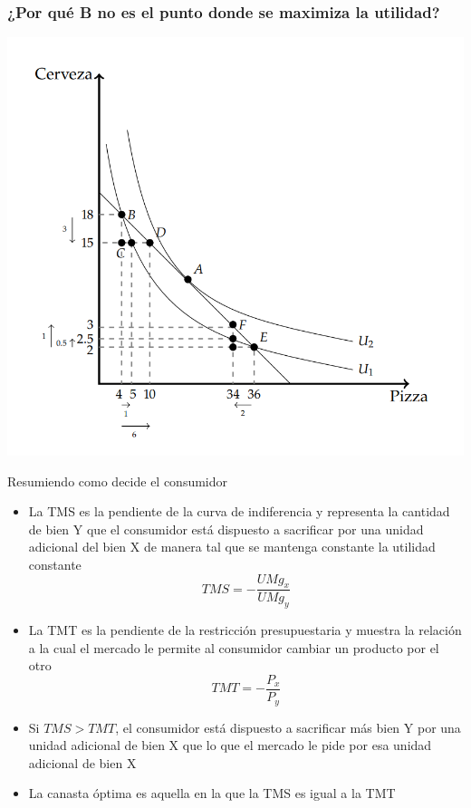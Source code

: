 \documentclass{beamer}
\begin{document}
\begin{frame}
\frametitle{¿Por qué B no es el punto donde se maximiza la utilidad?}
\centering
\includegraphics[scale=0.6]{../Figures/C8.3.png}
\end{frame}

\begin{frame}{Resumiendo como decide el consumidor}
    \begin{itemize}
        \item La TMS es la pendiente de la curva de indiferencia y representa la cantidad de bien Y que el consumidor está dispuesto a sacrificar por una unidad adicional del bien X de manera tal que se mantenga constante la utilidad constante
        \[TMS = - \frac{UMg_x}{UMg_y}\]
        \item La TMT es la pendiente de la restricción presupuestaria y muestra la relación a la cual el mercado le permite al consumidor cambiar un producto por el otro
        \[TMT = - \frac{P_x}{P_y}\]
        \item Si $TMS > TMT$, el consumidor está dispuesto a sacrificar más bien Y por una unidad adicional de bien X que lo que el mercado le pide por esa unidad adicional de bien X
        \item La canasta óptima es aquella en la que la TMS es igual a la TMT
    \end{itemize}
\end{frame}
\end{document}
